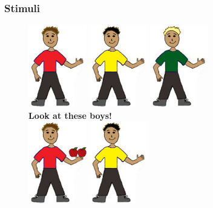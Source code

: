 \documentclass[man]{apa2}
\begin{document}
\subsubsection{Stimuli}
\begin{figure}
\begin{center} 
\includegraphics[width=1in]{figures/apples_context1_nothing.jpg}
\includegraphics[width=1in]{figures/apples_context2_nothing.jpg}
\includegraphics[width=1in]{figures/apples_context3_nothing.jpg}
\\ {\bf Look at these boys!}
\\
\vspace{1cm}
\includegraphics[width=1in]{figures/apples_context1_item.jpg}
\includegraphics[width=1in]{figures/apples_context2_nothing.jpg}

\end{center}
\end{figure}
\end{document}
